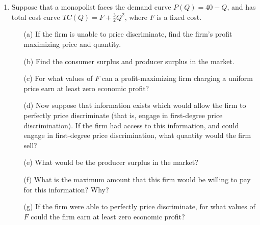 \documentclass[11pt]{article}
\begin{document}
\begin{enumerate}
  \item Suppose that a monopolist faces the demand curve $P(Q)=40-Q$, and has total cost curve $T C(Q)=F+\frac{3}{2} Q^{2}$, where $F$ is a fixed cost.

  \begin{enumerate}
    \item[(a)] If the firm is unable to price discriminate, find the firm's profit maximizing price and quantity.

    \item[(b)] Find the consumer surplus and producer surplus in the market.

    \item[(c)] For what values of $F$ can a profit-maximizing firm charging a uniform price earn at least zero economic profit?

    \item[(d)] Now suppose that information exists which would allow the firm to perfectly price discriminate (that is, engage in first-degree price discrimination). If the firm had access to this information, and could engage in first-degree price discrimination, what quantity would the firm sell?

    \item[(e)] What would be the producer surplus in the market?

    \item[(f)] What is the maximum amount that this firm would be willing to pay for this information? Why?

    \item[(g)] If the firm were able to perfectly price discriminate, for what values of $F$ could the firm earn at least zero economic profit?
  \end{enumerate}






\end{enumerate}
\end{document}
